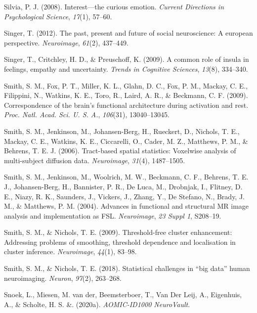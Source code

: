 \documentclass[12pt,american,a4paper,oneside,]{memoir} %
\begin{document}
\leavevmode\hypertarget{ref-silvia2008interest}{}%
Silvia, P. J. (2008). Interest---the curious emotion. \emph{Current Directions in Psychological Science}, \emph{17}(1), 57--60.

\leavevmode\hypertarget{ref-singer2012past}{}%
Singer, T. (2012). The past, present and future of social neuroscience: A european perspective. \emph{Neuroimage}, \emph{61}(2), 437--449.

\leavevmode\hypertarget{ref-singer2009common}{}%
Singer, T., Critchley, H. D., \& Preuschoff, K. (2009). A common role of insula in feelings, empathy and uncertainty. \emph{Trends in Cognitive Sciences}, \emph{13}(8), 334--340.

\leavevmode\hypertarget{ref-Smith2009-kj}{}%
Smith, S. M., Fox, P. T., Miller, K. L., Glahn, D. C., Fox, P. M., Mackay, C. E., Filippini, N., Watkins, K. E., Toro, R., Laird, A. R., \& Beckmann, C. F. (2009). Correspondence of the brain's functional architecture during activation and rest. \emph{Proc. Natl. Acad. Sci. U. S. A.}, \emph{106}(31), 13040--13045.

\leavevmode\hypertarget{ref-Smith2006-sf}{}%
Smith, S. M., Jenkinson, M., Johansen-Berg, H., Rueckert, D., Nichols, T. E., Mackay, C. E., Watkins, K. E., Ciccarelli, O., Cader, M. Z., Matthews, P. M., \& Behrens, T. E. J. (2006). Tract-based spatial statistics: Voxelwise analysis of multi-subject diffusion data. \emph{Neuroimage}, \emph{31}(4), 1487--1505.

\leavevmode\hypertarget{ref-Smith2004-sc}{}%
Smith, S. M., Jenkinson, M., Woolrich, M. W., Beckmann, C. F., Behrens, T. E. J., Johansen-Berg, H., Bannister, P. R., De Luca, M., Drobnjak, I., Flitney, D. E., Niazy, R. K., Saunders, J., Vickers, J., Zhang, Y., De Stefano, N., Brady, J. M., \& Matthews, P. M. (2004). Advances in functional and structural MR image analysis and implementation as FSL. \emph{Neuroimage}, \emph{23 Suppl 1}, S208--19.

\leavevmode\hypertarget{ref-smith2009threshold}{}%
Smith, S. M., \& Nichols, T. E. (2009). Threshold-free cluster enhancement: Addressing problems of smoothing, threshold dependence and localisation in cluster inference. \emph{Neuroimage}, \emph{44}(1), 83--98.

\leavevmode\hypertarget{ref-Smith2018-th}{}%
Smith, S. M., \& Nichols, T. E. (2018). Statistical challenges in ``big data'' human neuroimaging. \emph{Neuron}, \emph{97}(2), 263--268.

\leavevmode\hypertarget{ref-Snoek2020n-id1000}{}%
Snoek, L., Miesen, M. van der, Beemsterboer, T., Van Der Leij, A., Eigenhuis, A., \& Scholte, H. S. \&. (2020a). \emph{AOMIC-ID1000 NeuroVault}.
\end{document}
